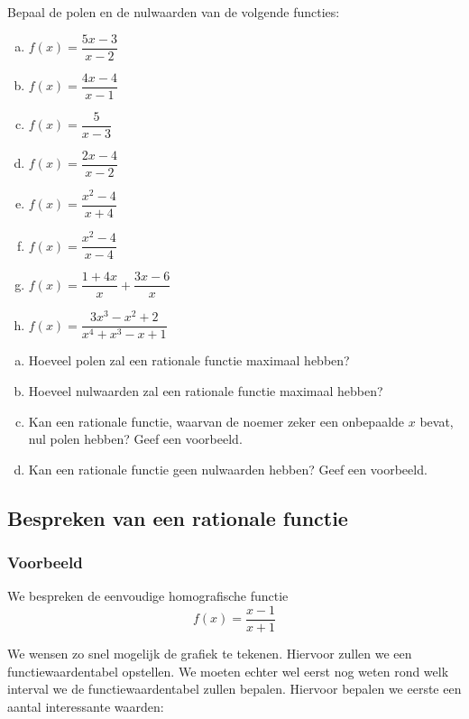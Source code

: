\documentclass[12pt]{article}
\begin{document}
\begin{oefening}
Bepaal de polen en de nulwaarden van de volgende functies:
\begin{multicols}{2}
\begin{enumerate}[(a)]
  \itemsep1em
  \item $f(x)=\dfrac{5x-3}{x-2}$
  \item $f(x)=\dfrac{4x-4}{x-1}$
  \item $f(x)=\dfrac{5}{x-3}$
  \item $f(x)=\dfrac{2x-4}{x-2}$
  \item $f(x)=\dfrac{x^2-4}{x+4}$
  \item $f(x)=\dfrac{x^2-4}{x-4}$
  \item $f(x)=\dfrac{1+4x}{x}+\dfrac{3x-6}{x}$
  \item $f(x)=\dfrac{3x^3-x^2+2}{x^4+x^3-x+1}$
\end{enumerate}
\end{multicols}\end{oefening}

\begin{oefening}
\begin{enumerate}[(a)]
  \item Hoeveel polen zal een rationale functie maximaal hebben?
  \item Hoeveel nulwaarden zal een rationale functie maximaal hebben?
  \item Kan een rationale functie, waarvan de noemer zeker een onbepaalde $x$ bevat, nul polen hebben? Geef een voorbeeld.
  \item Kan een rationale functie geen nulwaarden hebben? Geef een voorbeeld.
\end{enumerate}
\end{oefening}


\pagebreak
\subsection{Bespreken van een rationale functie}
\subsubsection*{Voorbeeld}
We bespreken de eenvoudige homografische functie
$$f(x)=\frac{x-1}{x+1}$$

We wensen zo snel mogelijk de grafiek te tekenen. Hiervoor zullen we een functiewaardentabel opstellen. We moeten echter wel eerst nog weten rond welk interval we de functiewaardentabel zullen bepalen. Hiervoor bepalen we eerste een aantal interessante waarden:
\end{document}
